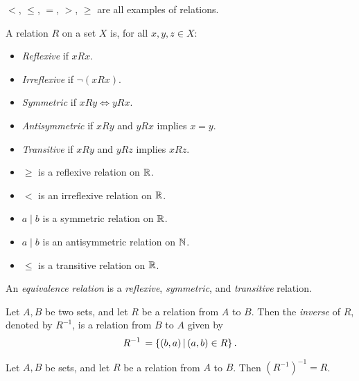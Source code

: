 \begin{exmp}
    $<$, $\leq$, $=$, $>$, $\geq$ are all examples of relations.
\end{exmp}

\begin{defn}
    A relation $R$ on a set $X$ is, for all $x, y, z \in X$:
    \begin{itemize}
        \item \emph{Reflexive} if $x R x$.
        \item \emph{Irreflexive} if $\neg(x R x)$.
        \item \emph{Symmetric} if $x R y \iff y R x$.
        \item \emph{Antisymmetric} if $x R y$ and $y R x$ implies $x = y$.
        \item \emph{Transitive} if $x R y$ and $y R z$ implies $x R z$.
    \end{itemize}
\end{defn}

\begin{exmp}\proofbreak
    \begin{itemize}
        \item $\geq$ is a reflexive relation on $\mathbb{R}$.
        \item $<$ is an irreflexive relation on $\mathbb{R}$.
        \item $a \mid b$ is a symmetric relation on $\mathbb{R}$.
        \item $a \mid b$ is an antisymmetric relation on $\mathbb{N}$.
        \item $\leq$ is a transitive relation on $\mathbb{R}$.
    \end{itemize}
\end{exmp}

\begin{defn}\label{equivalence-relation}
    An \emph{equivalence relation} is a \emph{reflexive}, \emph{symmetric}, and \emph{transitive} relation.
\end{defn}

\begin{defn}
    Let $A, B$ be two sets, and let $R$ be a relation from $A$ to $B$. Then the \emph{inverse} of $R$, denoted by $R^{-1}$, is a relation from $B$ to $A$ given by \[R^{-1} \,= \left\{(b, a) \,\middle|\, (a, b) \in R \right\}.\]
\end{defn}

\begin{prop}
    Let $A, B$ be sets, and let $R$ be a relation from $A$ to $B$. Then $\left(R^{-1}\right)^{-1} = R$.
\end{prop}

